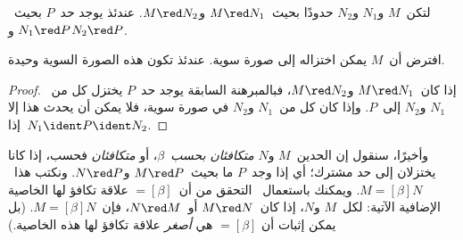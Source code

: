 \documentclass[../../../include/open-logic-section]{subfiles}
\begin{document}

\begin{thm}
لتكن~$M$ و$N_1$ و$N_2$ حدودًا بحيث~$M \red N_1$ و$M \red N_2$.
عندئذ يوجد حد~$P$ بحيث~$N_1 \red P$ و$N_2 \red P$.
\end{thm}

\begin{cor}
افترض أن~$M$ يمكن اختزاله إلى صورة سوية. عندئذ تكون هذه الصورة السوية
وحيدة.
\end{cor}

\begin{proof}
إذا كان~$M \red N_1$ و$M \red N_2$، فبالمبرهنة السابقة يوجد حد~$P$
يختزل كل من~$N_1$ و$N_2$ إلى~$P$. وإذا كان كل من~$N_1$ و$N_2$ في صورة
سوية، فلا يمكن أن يحدث هذا إلا إذا~$N_1 \ident P \ident N_2$.
\end{proof}

وأخيرًا، سنقول إن الحدين~$M$ و$N$ \emph{متكافئان بحسب~$\beta$}، أو
\emph{متكافئان} فحسب، إذا كانا يختزلان إلى حد مشترك؛ أي إذا وجد~$P$ ما
بحيث~$M \red P$ و$N \red P$. ونكتب هذا~$M \equal[\beta] N$. ويمكنك
باستعمال~ التحقق من أن~$\equal[\beta]$ علاقة
تكافؤ لها الخاصية الإضافية الآتية: لكل~$M$ و$N$، إذا كان~$M \red N$
أو~$N \red M$، فإن~$M \equal[\beta] N$. (بل يمكن إثبات أن
$\equal[\beta]$ هي \emph{أصغر} علاقة تكافؤ لها هذه الخاصية.)
\end{document}
